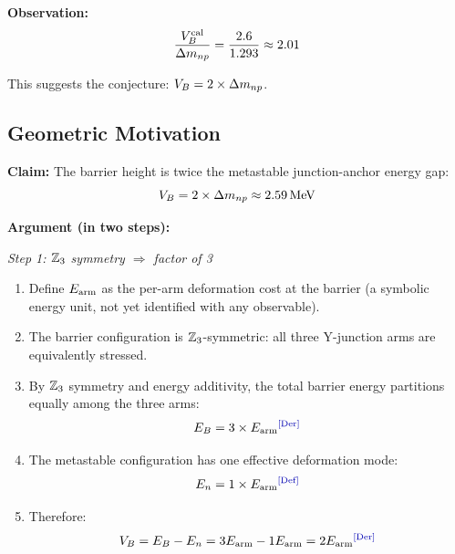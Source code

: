 \textbf{Observation:}
\begin{equation}
    \frac{V_B^{\text{cal}}}{\Delta m_{np}} = \frac{2.6}{1.293} \approx 2.01
\end{equation}

This suggests the conjecture: $\VB = 2 \times \Delta m_{np}$.

\subsection{Geometric Motivation}

\begin{derivationbox}[title=Conjecture: $\VB = 2 \times \Delta m_{np}$]
    \textbf{Claim:} The barrier height is twice the metastable junction-anchor energy gap:
    \begin{equation}
        V_B = 2 \times \Delta m_{np} \approx 2.59 \,\mathrm{MeV}
        \label{eq:VB_conjecture}
    \end{equation}

    \textbf{Argument (in two steps):}

    \emph{Step 1: $\mathbb{Z}_3$ symmetry $\Rightarrow$ factor of 3} \tagDer
    \begin{enumerate}
        \item Define $E_{\text{arm}}$ as the per-arm deformation cost at the barrier
              (a symbolic energy unit, not yet identified with any observable).
        \item The barrier configuration is $\mathbb{Z}_3$-symmetric: all three
              Y-junction arms are equivalently stressed.
        \item By $\mathbb{Z}_3$ symmetry and energy additivity, the total barrier
              energy partitions equally among the three arms:
              \begin{equation}
                  E_B = 3 \times \Earm \tagDer
                  \label{eq:EB_3Earm}
              \end{equation}
        \item The metastable configuration has one effective deformation mode:
              \begin{equation}
                  E_n = 1 \times \Earm \tagDef
                  \label{eq:En_1Earm}
              \end{equation}
        \item Therefore:
              \begin{equation}
                  \VB = E_B - E_n = 3\Earm - 1\Earm = 2\Earm \tagDer
                  \label{eq:VB_2Earm}
              \end{equation}
    \end{enumerate}


\end{derivationbox}
